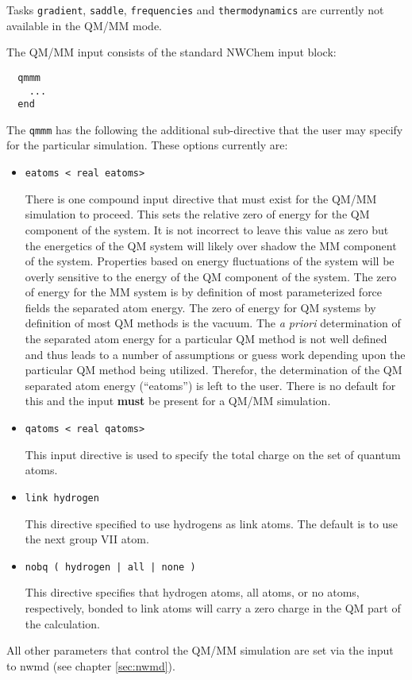 Tasks \verb+gradient+, \verb+saddle+, \verb+frequencies+ and
\verb+thermodynamics+ are currently not available in the QM/MM mode.  


The QM/MM input consists of the standard NWChem input block:
\begin{verbatim}
  qmmm
    ...
  end
\end{verbatim}

The \verb+qmmm+ has the following the additional sub-directive that the user
may specify for the particular simulation.  These options currently are:

\begin{itemize}

\item
\begin{verbatim}
eatoms < real eatoms>
\end{verbatim}

There is one compound input directive that must exist for the QM/MM
simulation to proceed.  This sets the relative zero of energy for the
QM component of the system.  It is not incorrect to leave this value as
zero but the energetics of the QM system will likely over shadow the
MM component of the system.  Properties based on energy fluctuations
of the system will be overly sensitive to the energy of the QM
component of the system.  The zero of energy for the MM system is by
definition of most parameterized force fields the separated atom
energy.  The zero of energy for QM systems by definition of most QM
methods is the vacuum.  The {\it a priori} determination of the
separated atom energy for a particular QM method is not well defined
and thus leads to a number of assumptions or guess work depending upon
the particular QM method being utilized.  Therefor, the determination
of the QM separated atom energy (``eatoms'') is left to the user.
There is no default for this and the input {\bf must} be present for a
QM/MM simulation.  

\item
\begin{verbatim}
qatoms < real qatoms>
\end{verbatim}

This input directive is used to specify the total charge on the set
of quantum atoms.

\item
\begin{verbatim}
link hydrogen
\end{verbatim}

This directive specified to use hydrogens as link atoms. The default
is to use the next group VII atom.  

\item
\begin{verbatim}
nobq ( hydrogen | all | none )
\end{verbatim}

This directive specifies that hydrogen atoms, all atoms, or no atoms,
respectively, bonded to link atoms will carry a zero charge in the
QM part of the calculation.

\end{itemize}
All other parameters that control the QM/MM simulation are set via the
input to nwmd (see chapter \ref{sec:nwmd}).

